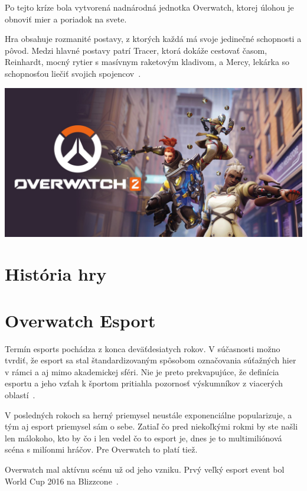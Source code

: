 \documentclass[10pt,oneside,slovak,a4paper]{article}
\begin{document}
Po tejto kríze bola vytvorená nadnárodná jednotka Overwatch, ktorej úlohou je obnoviť mier a poriadok na svete.

Hra obsahuje rozmanité postavy, z ktorých každá má svoje jedinečné schopnosti a pôvod. Medzi hlavné postavy patrí Tracer, ktorá dokáže cestovať časom, Reinhardt, mocný rytier s masívnym raketovým kladivom, a Mercy, lekárka so schopnosťou liečiť svojich spojencov~\cite{Overwatchanalysis}. 

\includegraphics[scale=0.2]{images/overwatch_title_image.jpg}


\section{História hry} \label{História hry}


\section{Overwatch Esport} \label{Overwatch Esport}

Termín esports pochádza z konca deväťdesiatych rokov. V súčasnosti možno tvrdiť, že esport sa stal štandardizovaným spôsobom označovania súťažných hier v rámci a aj mimo akademickej sféri. Nie je preto prekvapujúce, že definícia esportu a jeho vzťah k športom pritiahla pozornosť výskumníkov z viacerých oblastí~\cite{Overwatchesport}.

V posledných rokoch sa herný priemysel neustále exponenciálne popularizuje, a tým aj esport priemysel sám o sebe. Zatiaľ čo pred niekoľkými rokmi by ste 
našli len málokoho, kto by čo i len vedel čo to esport je, dnes je to multimiliónová scéna s milíonmi hráčov. Pre Overwatch to platí tiež.

Overwatch mal aktívnu scénu už od jeho vzniku. Prvý veľký esport event bol World Cup 2016 na Blizzcone~\cite{Overwatchesport}.
\end{document}
